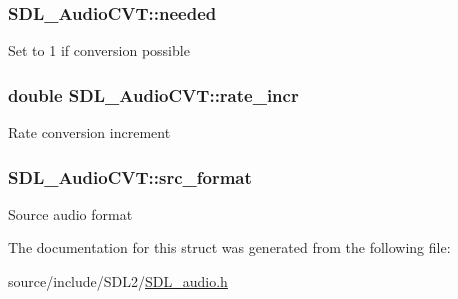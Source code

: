 \subsubsection[{needed}]{ S\+D\+L\+\_\+\+Audio\+C\+V\+T\+::needed}\label{struct_s_d_l___audio_c_v_t_ac600a035a48df05e14d3712fd6953ad4}
Set to 1 if conversion possible \hypertarget{struct_s_d_l___audio_c_v_t_ad886122c23a6673073baace31bff3b6c}{}
\subsubsection[{rate\+\_\+incr}]{\setlength{\rightskip}{0pt plus 5cm}double S\+D\+L\+\_\+\+Audio\+C\+V\+T\+::rate\+\_\+incr}\label{struct_s_d_l___audio_c_v_t_ad886122c23a6673073baace31bff3b6c}
Rate conversion increment \hypertarget{struct_s_d_l___audio_c_v_t_a6ae81231e017105e6d5e745a51732e16}{}
\subsubsection[{src\+\_\+format}]{ S\+D\+L\+\_\+\+Audio\+C\+V\+T\+::src\+\_\+format}\label{struct_s_d_l___audio_c_v_t_a6ae81231e017105e6d5e745a51732e16}
Source audio format 

The documentation for this struct was generated from the following file\+:\begin{DoxyCompactItemize}
\item 
source/include/\+S\+D\+L2/\hyperlink{_s_d_l__audio_8h}{S\+D\+L\+\_\+audio.\+h}\end{DoxyCompactItemize}
